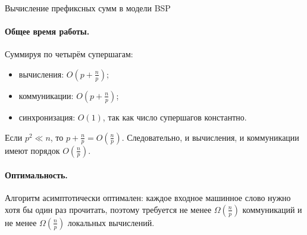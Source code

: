 \begin{Example}{Вычисление префиксных сумм в модели BSP}{}
	\paragraph{Общее время работы.}
	Суммируя по четырём супершагам:
	\begin{itemize}
		\item вычисления: \(O\!\left(p+\frac{n}{p}\right)\);
		\item коммуникации: \(O\!\left(p+\frac{n}{p}\right)\);
		\item синхронизация: \(O(1)\), так как число супершагов константно.
	\end{itemize}
	
	Если \(p^2 \ll n\), то \(p+\frac{n}{p}=O\!\left(\frac{n}{p}\right)\). Следовательно, и вычисления, и коммуникации имеют порядок \(O\!\left(\frac{n}{p}\right)\).
	
	\paragraph{Оптимальность.}
	Алгоритм асимптотически оптимален: каждое входное машинное слово нужно хотя бы один раз прочитать, поэтому требуется не менее \(\Omega\!\left(\frac{n}{p}\right)\) коммуникаций и не менее \(\Omega\!\left(\frac{n}{p}\right)\) локальных вычислений.
\end{Example}